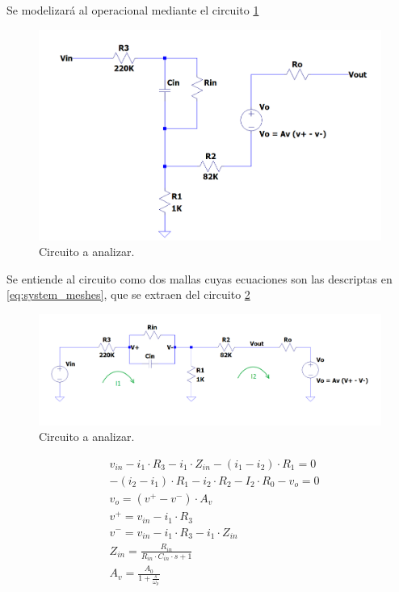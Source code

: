 Se modelizará al operacional mediante el circuito \ref{fig:non_ideal_circuit}
\begin{figure}[H]
    \begin{minipage}{\textwidth}
        \centering
        \includegraphics[width=\textwidth]{../EJ2/recursos_para_el_informe/circuito_a_analizar_no_ideal}
        \caption{Circuito a analizar.}
        \label{fig:non_ideal_circuit}
    \end{minipage}\hfill
\end{figure}

Se entiende al circuito como dos mallas cuyas ecuaciones son las descriptas en \ref{eq:system_meshes}, que se extraen del circuito \ref{fig:meshes_circuit}
\begin{figure}[H]
    \begin{minipage}{\textwidth}
        \centering
        \includegraphics[width=\textwidth]{../EJ2/recursos_para_el_informe/circuito_mallas}
        \caption{Circuito a analizar.}
        \label{fig:meshes_circuit}
    \end{minipage}\hfill
\end{figure}

\begin{align}
    &v_{in} - i_1 \cdot R_3 - i_1 \cdot Z_{in} - \left(i_1 - i_2\right) \cdot R_1 = 0 \\
    &-\left(i_2 - i_1\right) \cdot R_1 - i_2 \cdot R_2 - I_2 \cdot R_0 - v_o = 0 \\
    &v_o = \left(v^+ - v^-\right) \cdot A_v \\
    &v^+ = v_{in} - i_1 \cdot R_3 \\
    &v^- = v_{in} - i_1 \cdot R_3 - i_1 \cdot Z_{in} \\
    &Z_{in} = \frac{R_{in}}{R_{in} \cdot C_{in} \cdot s + 1} \label{eq:zin} \\
    &A_v = \frac{A_0}{1+\frac{s}{\omega_p}}
    \label{eq:system_meshes}
\end{align}

